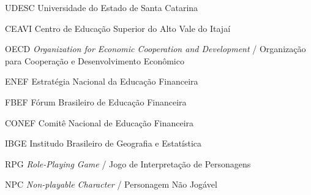 
\listoffigures*
\cleardoublepage



\listoftables*
\cleardoublepage

\begin{siglas}
	\item[UDESC]  Universidade do Estado de Santa Catarina
	\item[CEAVI]  Centro de Educação Superior do Alto Vale do Itajaí

	\item[OECD]   \textit{Organization for Economic Cooperation and Development} / Organização para Cooperação e Desenvolvimento Econômico
	\item[ENEF]   Estratégia Nacional da Educação Financeira
	\item[FBEF]   Fórum Brasileiro de Educação Financeira
	\item[CONEF]  Comitê Nacional de Educação Financeira
	\item[IBGE]   Institudo Brasileiro de Geografia e Estatística
	\item[RPG]    \textit{Role-Playing Game} / Jogo de Interpretação de Personagens
	\item[NPC]    \textit{Non-playable Character} / Personagem Não Jogável

\end{siglas}
